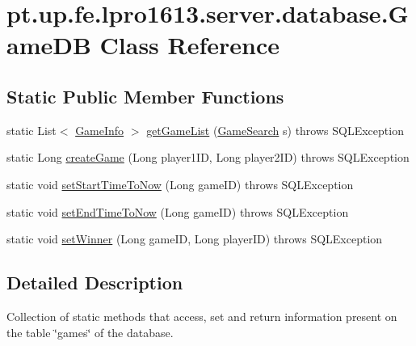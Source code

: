 \hypertarget{classpt_1_1up_1_1fe_1_1lpro1613_1_1server_1_1database_1_1_game_d_b}{}\section{pt.\+up.\+fe.\+lpro1613.\+server.\+database.\+Game\+DB Class Reference}
\label{classpt_1_1up_1_1fe_1_1lpro1613_1_1server_1_1database_1_1_game_d_b}
\subsection*{Static Public Member Functions}
\begin{DoxyCompactItemize}
\item 
static List$<$ \hyperlink{classpt_1_1up_1_1fe_1_1lpro1613_1_1sharedlib_1_1structs_1_1_game_info}{Game\+Info} $>$ \hyperlink{classpt_1_1up_1_1fe_1_1lpro1613_1_1server_1_1database_1_1_game_d_b_a4c567854868d16ae9b919c0655be65a7}{get\+Game\+List} (\hyperlink{classpt_1_1up_1_1fe_1_1lpro1613_1_1sharedlib_1_1structs_1_1_game_search}{Game\+Search} s)  throws S\+Q\+L\+Exception 
\item 
static Long \hyperlink{classpt_1_1up_1_1fe_1_1lpro1613_1_1server_1_1database_1_1_game_d_b_af4ec546a91795e5394379cfaaaf073cb}{create\+Game} (Long player1\+ID, Long player2\+ID)  throws S\+Q\+L\+Exception 
\item 
static void \hyperlink{classpt_1_1up_1_1fe_1_1lpro1613_1_1server_1_1database_1_1_game_d_b_a991c06b53598f46f4eea30c8c8fc31f7}{set\+Start\+Time\+To\+Now} (Long game\+ID)  throws S\+Q\+L\+Exception 
\item 
static void \hyperlink{classpt_1_1up_1_1fe_1_1lpro1613_1_1server_1_1database_1_1_game_d_b_ab352e7cd06250b77274f5c4f261f8116}{set\+End\+Time\+To\+Now} (Long game\+ID)  throws S\+Q\+L\+Exception 
\item 
static void \hyperlink{classpt_1_1up_1_1fe_1_1lpro1613_1_1server_1_1database_1_1_game_d_b_a30f4664442da6b7ae80b1821aaa195fa}{set\+Winner} (Long game\+ID, Long player\+ID)  throws S\+Q\+L\+Exception 
\end{DoxyCompactItemize}


\subsection{Detailed Description}
Collection of static methods that access, set and return information present on the table \char`\"{}games\char`\"{} of the database.

